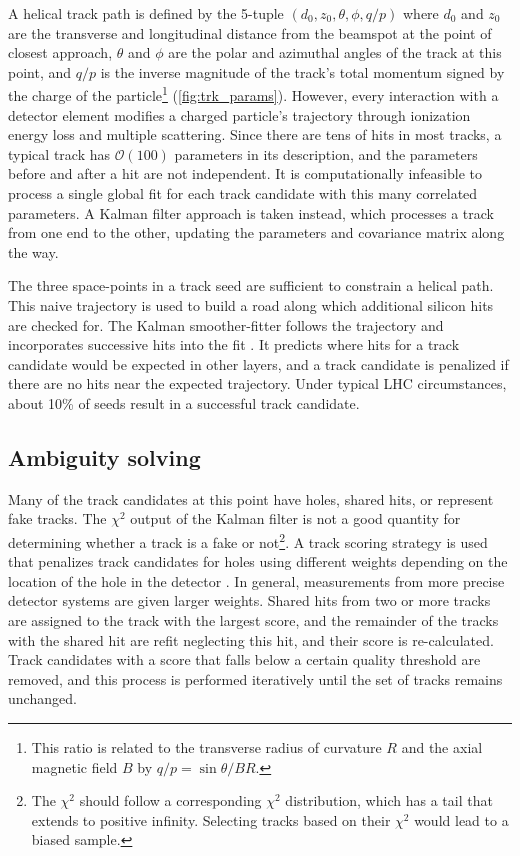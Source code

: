 A helical track path is defined by the 5-tuple
\( \left( d_0, z_0, \theta, \phi, q/p \right) \)
where $d_0$ and $z_0$ are the transverse and longitudinal distance from the beamspot at the point of closest approach, $\theta$ and $\phi$ are the polar and azimuthal angles of the track at this point, and $q/p$ is the inverse magnitude of the track's total momentum signed by the charge of the particle\footnote{This ratio is related to the transverse radius of curvature $R$ and the axial magnetic field $B$ by $q/p = \sin \theta / B R$.} (\cref{fig:trk_params}).
However, every interaction with a detector element modifies a charged particle's trajectory through ionization energy loss and multiple scattering.
Since there are tens of hits in most tracks, a typical track has $\mathcal{O}(100)$ parameters in its description, and the parameters before and after a hit are not independent.
It is computationally infeasible to process a single global fit for each track candidate with this many correlated parameters.
A Kalman filter approach is taken instead, which processes a track from one end to the other, updating the parameters and covariance matrix along the way.

The three space-points in a track seed are sufficient to constrain a helical path.
This naive trajectory is used to build a road along which additional silicon hits are checked for.
The Kalman smoother-fitter follows the trajectory and incorporates successive hits into the fit \cite{Cornelissen:2008zza}. %
It predicts where hits for a track candidate would be expected in other layers, and a track candidate is penalized if there are no hits near the expected trajectory. 
Under typical LHC circumstances, about 10\% of seeds result in a successful track candidate.

\subsection{Ambiguity solving} %

Many of the track candidates at this point have holes, shared hits, or represent fake tracks.
The $\chi^2$ output of the Kalman filter is not a good quantity for determining whether a track is a fake or not\footnote{The $\chi^2$ should follow a corresponding $\chi^2$ distribution, which has a tail that extends to positive infinity. Selecting tracks based on their $\chi^2$ would lead to a biased sample.}.
A track scoring strategy is used that penalizes track candidates for holes using different weights depending on the location of the hole in the detector \cite{Wicke:1998efw}.
In general, measurements from more precise detector systems are given larger weights.
Shared hits from two or more tracks are assigned to the track with the largest score, and the remainder of the tracks with the shared hit are refit neglecting this hit, and their score is re-calculated.
Track candidates with a score that falls below a certain quality threshold are removed, and this process is performed iteratively until the set of tracks remains unchanged.

